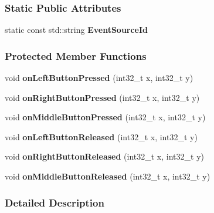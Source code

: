 \subsubsection*{Static Public Attributes}
\begin{DoxyCompactItemize}
\item 
static const std\+::string {\bfseries Event\+Source\+Id}\hypertarget{a00057_a665388ade3f4af2ca8acdbe6d1c3fd37}{}\label{a00057_a665388ade3f4af2ca8acdbe6d1c3fd37}

\end{DoxyCompactItemize}
\subsubsection*{Protected Member Functions}
\begin{DoxyCompactItemize}
\item 
void {\bfseries on\+Left\+Button\+Pressed} (int32\+\_\+t x, int32\+\_\+t y)\hypertarget{a00057_ae5fce156b3141240251170c0a900a1bb}{}\label{a00057_ae5fce156b3141240251170c0a900a1bb}

\item 
void {\bfseries on\+Right\+Button\+Pressed} (int32\+\_\+t x, int32\+\_\+t y)\hypertarget{a00057_aed9487b755b25e07ea432a39396dc27e}{}\label{a00057_aed9487b755b25e07ea432a39396dc27e}

\item 
void {\bfseries on\+Middle\+Button\+Pressed} (int32\+\_\+t x, int32\+\_\+t y)\hypertarget{a00057_a50cf4305c44271d7c392d1acef2cdb38}{}\label{a00057_a50cf4305c44271d7c392d1acef2cdb38}

\item 
void {\bfseries on\+Left\+Button\+Released} (int32\+\_\+t x, int32\+\_\+t y)\hypertarget{a00057_a331d962d312b7c3524a160a8776c0adb}{}\label{a00057_a331d962d312b7c3524a160a8776c0adb}

\item 
void {\bfseries on\+Right\+Button\+Released} (int32\+\_\+t x, int32\+\_\+t y)\hypertarget{a00057_a7db71cb556eb84740fc69bda4fae0562}{}\label{a00057_a7db71cb556eb84740fc69bda4fae0562}

\item 
void {\bfseries on\+Middle\+Button\+Released} (int32\+\_\+t x, int32\+\_\+t y)\hypertarget{a00057_a07f61c134f764da8ccec544421d3b8b4}{}\label{a00057_a07f61c134f764da8ccec544421d3b8b4}

\end{DoxyCompactItemize}


\subsubsection{Detailed Description}


